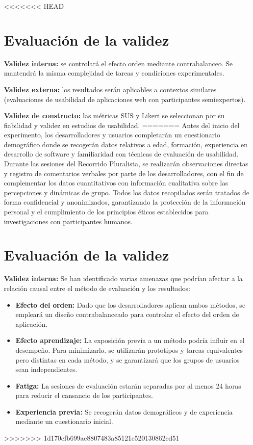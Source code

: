 \documentclass[a4paper,12pt]{report}
\begin{document}
<<<<<<< HEAD



\section{Evaluación de la validez}

\textbf{Validez interna:} se controlará el efecto orden mediante contrabalanceo. Se mantendrá la misma complejidad de tareas y condiciones experimentales.  

\textbf{Validez externa:} los resultados serán aplicables a contextos similares (evaluaciones de usabilidad de aplicaciones web con participantes semiexpertos).  

\textbf{Validez de constructo:} las métricas SUS y Likert se seleccionan por su fiabilidad y validez en estudios de usabilidad.  
=======
Antes del inicio del experimento, los desarrolladores y usuarios completarán un cuestionario demográfico donde se recogerán datos relativos a edad, formación, experiencia en desarrollo de software y familiaridad con técnicas de evaluación de usabilidad. Durante las sesiones del Recorrido Pluralista, se realizarán observaciones directas y registro de comentarios verbales por parte de los desarrolladores, con el fin de complementar los datos cuantitativos con información cualitativa sobre las percepciones y dinámicas de grupo.
Todos los datos recopilados serán tratados de forma confidencial y anonimizados, garantizando la protección de la información personal y el cumplimiento de los principios éticos establecidos para investigaciones con participantes humanos.

\section{Evaluación de la validez}

\textbf{Validez interna:} Se han identificado varias amenazas que podrían afectar a la relación causal entre el método 
de evaluación y los resultados: 
\begin{itemize}
    \item \textbf{Efecto del orden:} Dado que los desarrolladores aplican ambos métodos, se empleará un diseño contrabalanceado para controlar el efecto del orden de aplicación.
    \item \textbf{Efecto aprendizaje:} La exposición previa a un método podría influir en el desempeño. Para minimizarlo, se utilizarán prototipos y tareas equivalentes pero distintas en cada método, y se garantizará que los grupos de usuarios sean independientes.
    \item \textbf{Fatiga:} La sesiones de evaluación estarán separadas por al menos 24 horas para reducir el cansancio de los participantes. 
    \item \textbf{Experiencia previa:} Se recogerán datos demográficos y de experiencia mediante un cuestionario inicial.
\end{itemize}
>>>>>>> 1d170cfb699ae8807483a85121e520130862ed51
\end{document}
